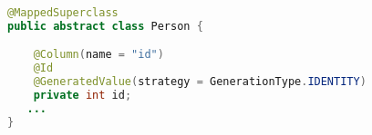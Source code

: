 \begin{lstlisting}[language=Java,  basicstyle=\footnotesize]
@MappedSuperclass
public abstract class Person {

	@Column(name = "id")
	@Id
	@GeneratedValue(strategy = GenerationType.IDENTITY)
	private int id;
   ...
}
\end{lstlisting}